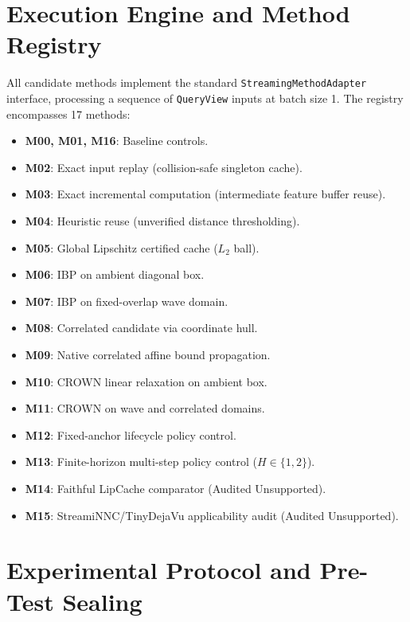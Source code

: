 \documentclass[10pt,twocolumn]{article}
\begin{document}
\section{Execution Engine and Method Registry}

All candidate methods implement the standard \texttt{StreamingMethodAdapter} interface, processing a sequence of \texttt{QueryView} inputs at batch size 1. The registry encompasses 17 methods:
\begin{itemize}
    \item \textbf{M00, M01, M16}: Baseline controls.
    \item \textbf{M02}: Exact input replay (collision-safe singleton cache).
    \item \textbf{M03}: Exact incremental computation (intermediate feature buffer reuse).
    \item \textbf{M04}: Heuristic reuse (unverified distance thresholding).
    \item \textbf{M05}: Global Lipschitz certified cache ($L_2$ ball).
    \item \textbf{M06}: IBP on ambient diagonal box.
    \item \textbf{M07}: IBP on fixed-overlap wave domain.
    \item \textbf{M08}: Correlated candidate via coordinate hull.
    \item \textbf{M09}: Native correlated affine bound propagation.
    \item \textbf{M10}: CROWN linear relaxation on ambient box.
    \item \textbf{M11}: CROWN on wave and correlated domains.
    \item \textbf{M12}: Fixed-anchor lifecycle policy control.
    \item \textbf{M13}: Finite-horizon multi-step policy control ($H \in \{1, 2\}$).
    \item \textbf{M14}: Faithful LipCache comparator (Audited Unsupported).
    \item \textbf{M15}: StreamiNNC/TinyDejaVu applicability audit (Audited Unsupported).
\end{itemize}

\section{Experimental Protocol and Pre-Test Sealing}
\end{document}
